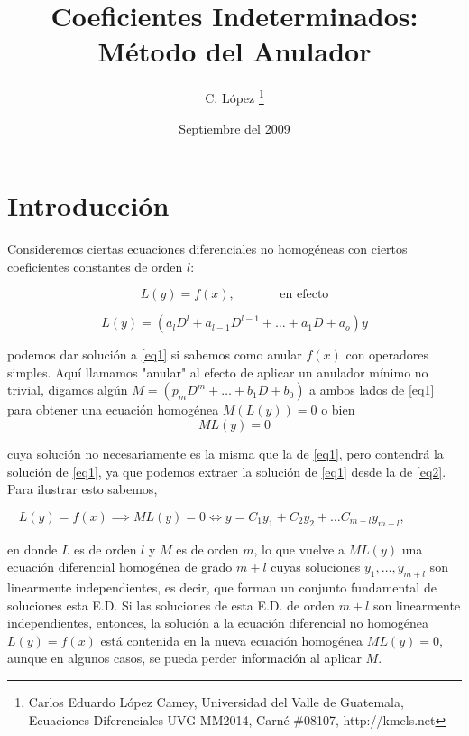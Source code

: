 \documentclass{article}
\title{Coeficientes Indeterminados: M\'{e}todo del Anulador}
\author{C. L\'{o}pez \thanks{Carlos Eduardo L\'{o}pez Camey, Universidad del Valle de Guatemala, Ecuaciones Diferenciales UVG-MM2014, Carné \#08107, http://kmels.net}}
\date{Septiembre del 2009}
\newcommand{\eqtab}{\:\:\:\:\:\:\:\:\:\:\:\:\:\:\:\:}
\theoremstyle{definition}
\begin{document}
\maketitle
\begin{abstract}
	
\end{abstract}

\section {Introducci\'{o}n}

Consideremos ciertas ecuaciones diferenciales no homog\'{e}neas con ciertos coeficientes constantes de orden $l$:

\begin{equation}\label{eq1}
	L(y) = f(x),\eqtab \text{en efecto}
\end{equation}

\begin{equation*}
	L(y) = (a_lD^l + a_{l-1}D^{l-1} + \dots + a_1D + a_o)y
\end{equation*}

podemos dar soluci\'{o}n a \eqref{eq1} si sabemos como anular $f(x)$ con operadores simples. Aqu\'{i} llamamos "anular" al efecto de aplicar un anulador m\'{i}nimo no trivial, digamos alg\'{u}n $M = (p_mD^m + \dots + b_1D + b_0)$ a ambos lados de \eqref{eq1} para obtener una ecuaci\'{o}n homog\'{e}nea $M(L(y)) = 0$ o bien
\begin{equation}\label{eq2}
	ML(y) = 0
\end{equation}

cuya soluci\'{o}n no necesariamente es la misma que la de \eqref{eq1}, pero contendr\'{a} la soluci\'{o}n de \eqref{eq1}, ya que podemos extraer la soluci\'{o}n de \eqref{eq1} desde la de \eqref{eq2}. Para ilustrar esto sabemos,

\begin{equation*}
	L(y) = f(x) \implies ML(y) = 0 \Leftrightarrow y = C_1y_1 + C_2y_2 + \dots C_{m+l}y_{m+l}, \eqtab
\end{equation*} 

en donde $L$ es de orden $l$ y $M$ es de orden $m$, lo que vuelve a $ML(y)$ una ecuaci\'{o}n diferencial homog\'{e}nea de grado $m+l$ cuyas soluciones $y_1, \dots, y_{m+l}$ son linearmente independientes, es decir, que forman un conjunto fundamental de soluciones esta E.D. Si las soluciones de esta E.D. de orden $m+l$ son linearmente independientes, entonces, la soluci\'{o}n a la ecuaci\'{o}n diferencial no homog\'{e}nea $L(y) = f(x)$ est\'{a} contenida en la nueva ecuaci\'{o}n homog\'{e}nea $ML(y) = 0$, aunque en algunos casos, se pueda perder informaci\'{o}n al aplicar $M$.
\end{document}
